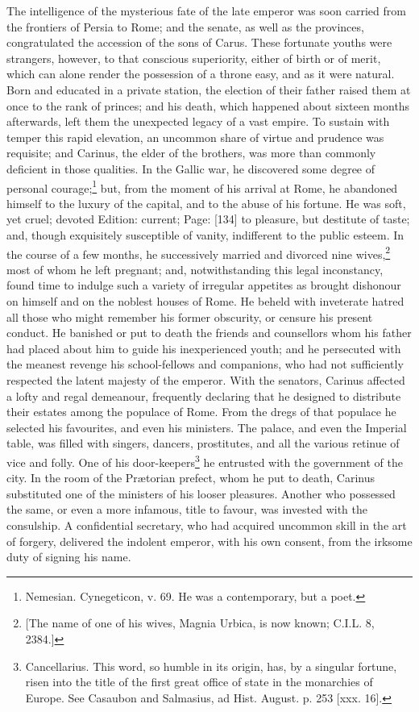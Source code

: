 The intelligence of the mysterious fate of the late emperor was soon carried from the frontiers of Persia to Rome; and the senate, as well as the provinces, congratulated the accession of the sons of Carus. These fortunate youths were strangers, however, to that conscious superiority, either of birth or of merit, which can alone render the possession of a throne easy, and as it were natural. Born and educated in a private station, the election of their father raised them at once to the rank of princes; and his death, which happened about sixteen months afterwards, left them the unexpected legacy of a vast empire. To sustain with temper this rapid elevation, an uncommon share of virtue and prudence was requisite; and Carinus, the elder of the brothers, was more than commonly deficient in those qualities. In the Gallic war, he discovered some degree of personal courage;\footnote{Nemesian. Cynegeticon, v. 69. He was a contemporary, but a poet.} but, from the moment of his arrival at Rome, he abandoned himself to the luxury of the capital, and to the abuse of his fortune. He was soft, yet cruel; devoted Edition: current; Page: [134] to pleasure, but destitute of taste; and, though exquisitely susceptible of vanity, indifferent to the public esteem. In the course of a few months, he successively married and divorced nine wives,\footnote{[The name of one of his wives, Magnia Urbica, is now known; C.I.L. 8, 2384.]} most of whom he left pregnant; and, notwithstanding this legal inconstancy, found time to indulge such a variety of irregular appetites as brought dishonour on himself and on the noblest houses of Rome. He beheld with inveterate hatred all those who might remember his former obscurity, or censure his present conduct. He banished or put to death the friends and counsellors whom his father had placed about him to guide his inexperienced youth; and he persecuted with the meanest revenge his school-fellows and companions, who had not sufficiently respected the latent majesty of the emperor. With the senators, Carinus affected a lofty and regal demeanour, frequently declaring that he designed to distribute their estates among the populace of Rome. From the dregs of that populace he selected his favourites, and even his ministers. The palace, and even the Imperial table, was filled with singers, dancers, prostitutes, and all the various retinue of vice and folly. One of his door-keepers\footnote{Cancellarius. This word, so humble in its origin, has, by a singular fortune, risen into the title of the first great office of state in the monarchies of Europe. See Casaubon and Salmasius, ad Hist. August. p. 253 [xxx. 16].} he entrusted with the government of the city. In the room of the Prætorian prefect, whom he put to death, Carinus substituted one of the ministers of his looser pleasures. Another who possessed the same, or even a more infamous, title to favour, was invested with the consulship. A confidential secretary, who had acquired uncommon skill in the art of forgery, delivered the indolent emperor, with his own consent, from the irksome duty of signing his name.

